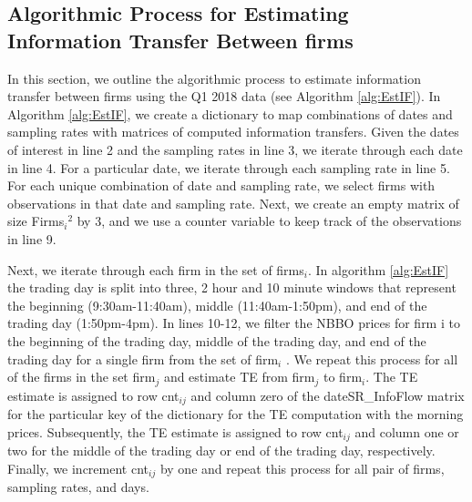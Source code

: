 \subsection{Algorithmic Process for Estimating Information Transfer Between firms}

In this section, we outline the algorithmic process to estimate information transfer between firms using the Q1 2018 data (see Algorithm \ref{alg:EstIF}).  In Algorithm \ref{alg:EstIF},  we create a dictionary to map combinations of dates and sampling rates with matrices of computed information transfers.  Given the dates of interest in line 2 and the sampling rates in line 3, we iterate through each date in line 4.  For a particular date, we iterate through each sampling rate in line 5.  For each unique combination of date and sampling rate, we select firms with observations in that date and sampling rate. Next, we create an empty matrix of size Firms\(_i\)\(^2\) by 3, and we use a counter variable to keep track of the observations in line 9. 

Next, we iterate through each firm in the set of firms\(_i\).  In algorithm \ref{alg:EstIF} the trading day is split into three, 2 hour and 10 minute windows that represent the beginning (9:30am-11:40am),  middle (11:40am-1:50pm),  and end of the trading day (1:50pm-4pm).  In lines 10-12, we filter the NBBO prices for firm i to the beginning of the trading day,  middle of the trading day, and end of the trading day for a single firm from the set of firm\(_i\) . We repeat this process for all of the firms in the set firm\(_j\) and estimate TE from firm\(_j\) to firm\(_i\).   The TE estimate is assigned to row cnt\(_{ij}\) and column zero of the dateSR\_InfoFlow matrix for the particular key of the dictionary for the TE computation with the morning prices.  Subsequently, the TE estimate is assigned to row cnt\(_{ij}\) and column one or two for the middle of the trading day or end of the trading day, respectively.   Finally, we increment cnt\(_{ij}\) by one and repeat this process for all pair of firms, sampling rates, and days.   \\

